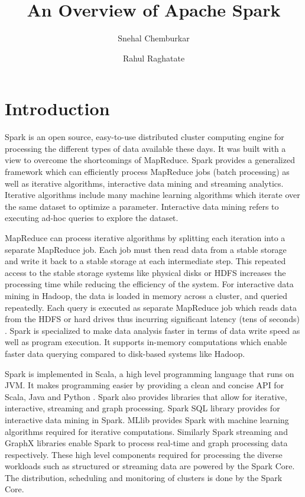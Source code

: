 \documentclass[9pt,twocolumn,twoside]{../../styles/osajnl}
\title{An Overview of Apache Spark}
\author[1]{Snehal Chemburkar}
\author[1]{Rahul Raghatate}
\affil[1]{School of Informatics and Computing, Bloomington, IN 47408,
  U.S.A.}
\affil[*]{Corresponding authors: snehchem@iu.edu, rraghtate@iu.edu}
\begin{document}
\maketitle

\section{Introduction}

Spark is an open source, easy-to-use distributed cluster computing
engine for processing the different types of data available these
days. It was built with a view to overcome the shortcomings of
MapReduce. Spark provides a generalized framework which can
efficiently process MapReduce jobs (batch processing) as well as
iterative algorithms, interactive data mining and streaming
analytics. Iterative algorithms include many machine learning
algorithms which iterate over the same dataset to optimize a
parameter. Interactive data mining refers to executing ad-hoc queries
to explore the dataset.

MapReduce can process iterative algorithms by splitting each iteration
into a separate MapReduce job. Each job must then read data from a
stable storage and write it back to a stable storage at each
intermediate step. This repeated access to the stable storage systems
like physical disks or HDFS increases the processing time while
reducing the efficiency of the system. For interactive data mining in
Hadoop, the data is loaded in memory across a cluster, and queried
repeatedly. Each query is executed as separate MapReduce job which
reads data from the HDFS or hard drives thus incurring significant
latency (tens of seconds) \cite{paper-zaharia}.  Spark is specialized
to make data analysis faster in terms of data write speed as well as
program execution. It supports in-memory computations which enable
faster data querying compared to disk-based systems like Hadoop.

Spark is implemented in Scala, a high level programming language that
runs on JVM. It makes programming easier by providing a clean and
concise API for Scala, Java and Python \cite{paper-zaharia}. Spark
also provides libraries that allow for iterative, interactive,
streaming and graph processing. Spark SQL library provides for
interactive data mining in Spark. MLlib provides Spark with machine
learning algorithms required for iterative computations. Similarly
Spark streaming and GraphX libraries enable Spark to process real-time
and graph processing data respectively. These high level components
required for processing the diverse workloads such as structured or
streaming data are powered by the Spark Core. The distribution,
scheduling and monitoring of clusters is done by the Spark Core.
\end{document}
